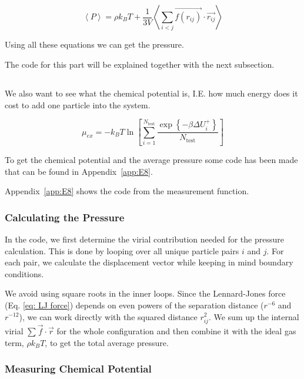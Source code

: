\begin{equation}
	\left\langle P \right\rangle= \rho k_B T + \frac{1}{3V} \left\langle \sum_{i<j} \vec{f(r_{ij})} \cdot \vec{r_{ij}} \right\rangle
	\label{eq: pressure}
\end{equation}


Using all these equations we can get the pressure.

The code for this part will be explained together with the next subsection.



\subsection{}

We also want to see what the chemical potential is, I.E. how much energy does it cost to add one particle into the system. 

\begin{equation}
	\mu_{ex} = -k_B T \ln \left[ \sum_{i=1}^{N_\text{test}} \frac{\exp \left\{-\beta \Delta U_i^+\right\}}{N_\text{test}}\right]
	\label{eq: chem pot}
\end{equation}


To get the chemical potential and the average pressure some code has been made that can be found in Appendix~\ref{app:E8}.

 
Appendix~\ref{app:E8} shows the code from the measurement function. 
 
\subsubsection{Calculating the Pressure}
 
In the code, we first determine the virial contribution needed for the pressure calculation. This is done by looping over all unique particle pairs $i$ and $j$. For each pair, we calculate the displacement vector while keeping in mind boundary conditions.
 
We avoid using square roots in the inner loops. Since the Lennard-Jones force (Eq. \ref{eq: LJ force}) depends on even powers of the separation distance ($r^{-6}$ and $r^{-12}$), we can work directly with the squared distance $r_{ij}^2$. We sum up the internal virial $\sum \vec{f} \cdot \vec{r}$ for the whole configuration and then combine it with the ideal gas term, $\rho k_B T$, to get the total average pressure.
 
 
 
\subsubsection{Measuring Chemical Potential}
 
